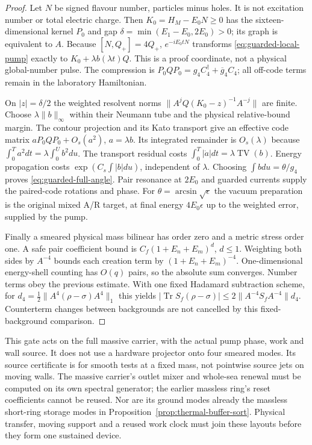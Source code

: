 \begin{proof}
Let $N$ be signed flavour number, particles minus holes.
It is not excitation number or total electric charge.
Then $K_0=H_M-E_0N\ge0$ has the sixteen-dimensional kernel
$P_0$ and gap $\delta=\min(E_1-E_0,2E_0)>0$; its graph is
equivalent to $A$. Because $[N,Q_+]=4Q_+$,
$e^{-iE_0tN}$ transforms \eqref{eq:guarded-local-pump} exactly
to $K_0+\lambda b(\lambda t)Q$.
This is a proof coordinate, not a physical global-number pulse.
The compression is $P_0QP_0=g_4C_4^\dagger+\overline g_4C_4$;
all off-code terms remain in the laboratory Hamiltonian.

On $|z|=\delta/2$ the weighted resolvent norms
$\|A^jQ(K_0-z)^{-1}A^{-j}\|$ are finite.
Choose $\lambda\|b\|_\infty$ within their Neumann tube and
the physical relative-bound margin. The contour projection and
its Kato transport give an effective code matrix
$aP_0QP_0+O_s(a^2)$, $a=\lambda b$.
Its integrated remainder is $O_s(\lambda)$ because
$\int_0^T a^2dt=\lambda\int_0^U b^2du$.
The transport residual costs
$\int_0^T|\dot a|dt=\lambda\operatorname{TV}(b)$.
Energy propagation costs $\exp(C_s\int|b|du)$, independent
of $\lambda$. Choosing $\int bdu=\theta/g_4$ proves
\eqref{eq:guarded-full-angle}. Pair resonance at $2E_0$ and
guarded currents supply the paired-code rotations and phase.
For $\theta=\arcsin\sqrt\epsilon$ the vacuum preparation is
the original mixed A/R target, at final energy $4E_0\epsilon$
up to the weighted error, supplied by the pump.

Finally a smeared physical mass bilinear has order zero and a
metric stress order one. A safe pair coefficient bound is
$C_f(1+E_n+E_m)^d$, $d\le1$.
Weighting both sides by $A^{-4}$ bounds each creation term
by $(1+E_n+E_m)^{-4}$. One-dimensional energy-shell counting
has $O(q)$ pairs, so the absolute sum converges.
Number terms obey the previous estimate. With one fixed
Hadamard subtraction scheme, for
$d_4=\frac12\|A^4(\rho-\sigma)A^4\|_1$ this yields
$|\operatorname{Tr}S_f(\rho-\sigma)|\le2\|A^{-4}S_fA^{-4}\|d_4$.
Counterterm changes between backgrounds are not cancelled by
this fixed-background comparison.
\end{proof}

This gate acts on the full massive carrier, with the actual pump
phase, work and wall source. It does not use a hardware projector
onto four smeared modes. Its source certificate is for smooth
tests at a fixed mass, not pointwise source jets on moving walls.
The massive carrier's outlet mixer and whole-sea renewal must be
computed on its own spectral generator; the earlier massless
ring's reset coefficients cannot be reused. Nor are its ground
modes already the massless short-ring storage modes in
Proposition~\ref{prop:thermal-buffer-sort}. Physical transfer,
moving support and a reused work clock must join these layouts
before they form one sustained device.

